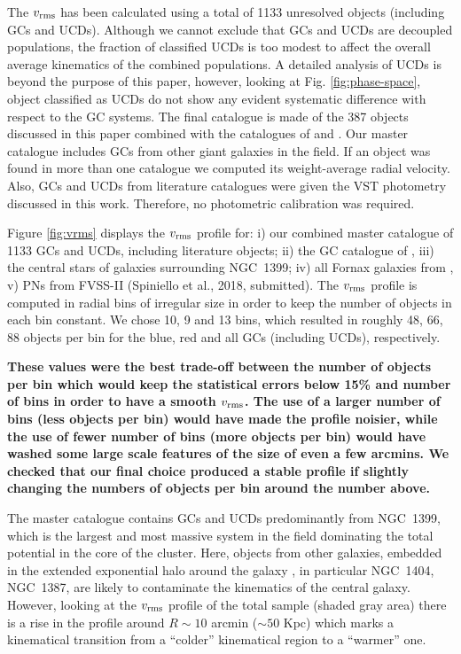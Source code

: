 \documentclass[usenatbib]{mnras}
\begin{document}
The $v_{\rm rms}$ has been calculated using a total of 1133 unresolved objects
(including GCs and UCDs). Although we cannot exclude that GCs and UCDs are
decoupled populations,
the fraction of classified UCDs is too modest to affect the overall average
kinematics of the combined populations. A detailed analysis of UCDs is beyond
the purpose of this paper,
however, looking at Fig. \ref{fig:phase-space}, object classified as UCDs do
not show any evident systematic difference with respect to the GC systems.
The final catalogue is made of the 387 objects discussed in this paper
combined with the catalogues of \citet{Bergond07} and \citet{Schuberth}. Our master catalogue
includes GCs from other giant galaxies in the field. If an
object was found in more than one catalogue we computed its weight-average radial
velocity. Also, GCs and UCDs from
literature catalogues were given the VST photometry discussed in this work.
Therefore, no photometric calibration was required.

Figure \ref{fig:vrms} displays the $v_{\rm rms}$ profile for: i) our combined master
catalogue of 1133 GCs and UCDs, including literature objects; ii) the GC catalogue of
\citet{Schuberth}, iii) the central stars of galaxies surrounding NGC~1399; iv)
all Fornax galaxies from \citet{Drinkwater00}, v) PNs from FVSS-II (Spiniello et al., 2018, submitted).
The $v_{\rm rms}$ profile is computed in radial bins of irregular
size in order to keep the number of objects in each bin constant.
We chose 10, 9 and 13 bins, which resulted in roughly 48, 66, 88 objects per
bin for the blue, red and all GCs (including UCDs), respectively. 

\textbf{These values were the best trade-off between the number of objects per bin 
which would keep the statistical errors below 15\% \citep{Napolitano01} 
and number of bins in order to have a smooth $v_{\rm rms}$. 
The use of a larger number of bins (less objects per bin) would have made 
the profile noisier, while the use of fewer number of bins (more objects per bin) would have 
washed some large scale features of the size of even a few arcmins. 
We checked that our final choice produced a stable profile if slightly changing 
the numbers of objects per bin around the number above.}

The master catalogue contains GCs and UCDs predominantly from NGC~1399, which
is the largest and most massive system in the field dominating the total
potential in the core of the cluster. Here, objects from other galaxies,
embedded in the extended exponential halo around the galaxy \citep{Iodice16},
in particular NGC~1404, NGC~1387, are likely to contaminate the
kinematics of the central galaxy. However, looking at the $v_{\rm rms}$
profile of the total sample (shaded gray area) there is a rise in the
profile around $R\sim10$ arcmin ($\sim 50$ Kpc) which marks a kinematical transition from a
``colder'' kinematical region to a ``warmer'' one.
\end{document}
